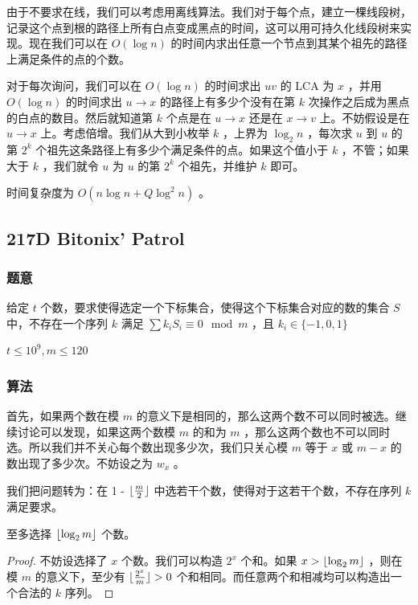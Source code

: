 \documentclass[11pt]{article}
\begin{document}
    由于不要求在线，我们可以考虑用离线算法。我们对于每个点，建立一棵线段树，记录这个点到根的路径上所有白点变成黑点的时间，这可以用可持久化线段树来实现。现在我们可以在 $O(\log n)$ 的时间内求出任意一个节点到其某个祖先的路径上满足条件的点的个数。

    对于每次询问，我们可以在 $O(\log n)$ 的时间求出 $uv$ 的 LCA 为 $x$ ，并用 $O(\log n)$ 的时间求出 $u \to x$ 的路径上有多少个没有在第 $k$ 次操作之后成为黑点的白点的数目。然后就知道第 $k$ 个点是在 $u \to x$ 还是在 $x \to v$ 上。不妨假设是在 $u \to x$ 上。考虑倍增。我们从大到小枚举 $k$ ，上界为 $\log_2 n$ ，每次求 $u$ 到 $u$ 的第 $2^k$ 个祖先这条路径上有多少个满足条件的点。如果这个值小于 $k$ ，不管；如果大于 $k$ ，我们就令 $u$ 为 $u$ 的第 $2^k$ 个祖先，并维护 $k$ 即可。

    时间复杂度为 $O(n \log n + Q \log^2 n)$ 。
\subsection{217D  Bitonix' Patrol}
\label{sec-4-7}
\subsubsection{题意}
\label{sec-4-7-1}

    给定 $t$ 个数，要求使得选定一个下标集合，使得这个下标集合对应的数的集合 $S$ 中，不存在一个序列 $k$ 满足 $\sum k_i S_i \equiv 0 \mod{m}$ ，且 $k_i \in \{-1, 0, 1\}$

    $t \leq 10^9, m \leq 120$
\subsubsection{算法}
\label{sec-4-7-2}

    首先，如果两个数在模 $m$ 的意义下是相同的，那么这两个数不可以同时被选。继续讨论可以发现，如果这两个数模 $m$ 的和为 $m$ ，那么这两个数也不可以同时选。所以我们并不关心每个数出现多少次，我们只关心模 $m$ 等于 $x$ 或 $m - x$ 的数出现了多少次。不妨设之为 $w_x$ 。

    我们把问题转为：在 1 - ${\lfloor \frac{m}{2} \rfloor}$ 中选若干个数，使得对于这若干个数，不存在序列 $k$ 满足要求。

\begin{theorem}
  至多选择 ${\lfloor \log_2 m \rfloor}$ 个数。
\end{theorem}
\begin{proof}
  不妨设选择了 $x$ 个数。我们可以构造 $2^x$ 个和。如果 $x > {\lfloor \log_2 m \rfloor}$ ，则在模 $m$ 的意义下，至少有 ${\lfloor \frac{2^x}{m} \rfloor} > 0$ 个和相同。而任意两个和相减均可以构造出一个合法的 $k$ 序列。
\end{proof}
\end{document}
